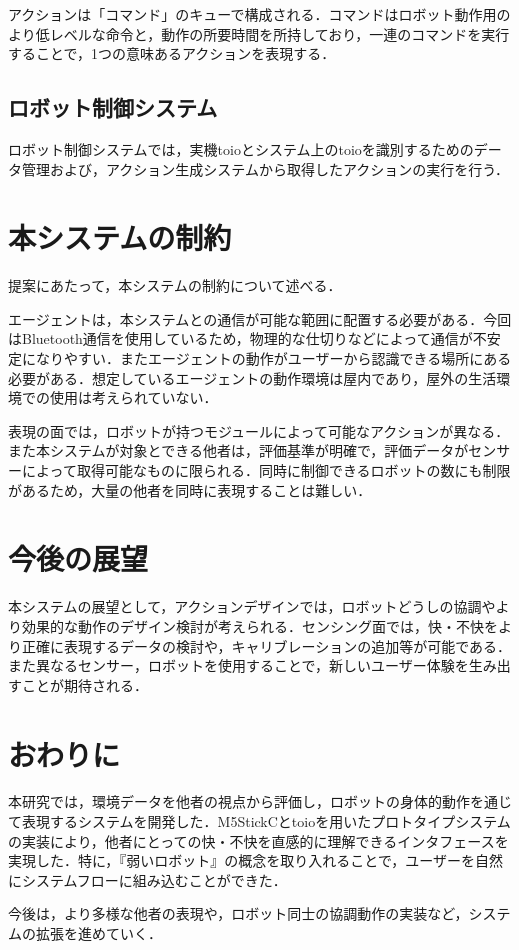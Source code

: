 \documentclass[paper=a4paper,jafontsize=9pt,head_space=15mm,gutter=20mm,
twocolumn,number_of_lines=49, line_length=26zw]{myuarticle}
\begin{document}
アクションは「コマンド」のキューで構成される．コマンドはロボット動作用のより低レベルな命令と，動作の所要時間を所持しており，一連のコマンドを実行することで，1つの意味あるアクションを表現する．

\subsection{ロボット制御システム}
ロボット制御システムでは，実機toioとシステム上のtoioを識別するためのデータ管理および，アクション生成システムから取得したアクションの実行を行う．

\section{本システムの制約}

提案にあたって，本システムの制約について述べる．

エージェントは，本システムとの通信が可能な範囲に配置する必要がある．今回はBluetooth通信を使用しているため，物理的な仕切りなどによって通信が不安定になりやすい．またエージェントの動作がユーザーから認識できる場所にある必要がある．想定しているエージェントの動作環境は屋内であり，屋外の生活環境での使用は考えられていない．

表現の面では，ロボットが持つモジュールによって可能なアクションが異なる．また本システムが対象とできる他者は，評価基準が明確で，評価データがセンサーによって取得可能なものに限られる．同時に制御できるロボットの数にも制限があるため，大量の他者を同時に表現することは難しい．

\section{今後の展望}
本システムの展望として，アクションデザインでは，ロボットどうしの協調やより効果的な動作のデザイン検討が考えられる．センシング面では，快・不快をより正確に表現するデータの検討や，キャリブレーションの追加等が可能である．また異なるセンサー，ロボットを使用することで，新しいユーザー体験を生み出すことが期待される．

\section{おわりに}
本研究では，環境データを他者の視点から評価し，ロボットの身体的動作を通じて表現するシステムを開発した．M5StickCとtoioを用いたプロトタイプシステムの実装により，他者にとっての快・不快を直感的に理解できるインタフェースを実現した．特に，『弱いロボット』の概念を取り入れることで，ユーザーを自然にシステムフローに組み込むことができた．

今後は，より多様な他者の表現や，ロボット同士の協調動作の実装など，システムの拡張を進めていく．

\renewcommand{\refname}{　参考文献}


\end{document}
